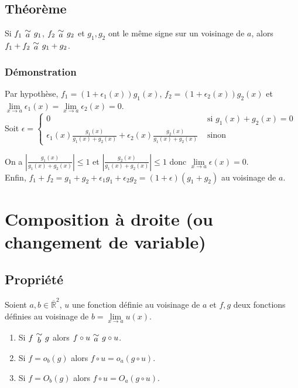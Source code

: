 \documentclass[a4paper,10pt]{book} %
\newcommand{\Rb}{\overline{\mathbb{R}}}
\newcommand{\equi}[1]{\renewcommand{\arraystretch}{0.3}~\begin{matrix}\sim\\#1\end{matrix}~\renewcommand{\arraystretch}{1}}
\begin{document}
\subsection{Théorème}
Si $f_1 \equi{a} g_1$, $f_2 \equi{a}g_2$ et $g_1,g_2$ ont le même signe sur un voisinage de $a$, alors $f_1+f_2 \equi{a} g_1+g_2$.

\subsubsection{Démonstration}
Par hypothèse, $f_1=(1+\epsilon_1(x))g_1(x)$, $f_2=(1+\epsilon_2(x))g_2(x)$ et $\lim\limits_{x\rightarrow a}\epsilon_1(x)=\lim\limits_{x\rightarrow a}\epsilon_2(x)=0$.\\

Soit $\epsilon=\left\{\begin{array}{clr}
0 &\text{ si }g_1(x)+g_2(x)=0 \\ 
\epsilon_1(x)\frac{g_1(x)}{g_1(x)+g_2(x)}+\epsilon_2(x)\frac{g_2(x)}{g_1(x)+g_2(x)} &\text{ sinon}
\end{array}\right.$\\

\smallskip

On a $|\frac{g_1(x)}{g_1(x)+g_2(x)}|\leq 1$ et $|\frac{g_2(x)}{g_1(x)+g_2(x)}|\leq 1$ donc $\lim\limits_{x\rightarrow a}\epsilon(x)=0$.\\

Enfin, $f_1+f_2=g_1+g_2+\epsilon_1g_1+\epsilon_2g_2=(1+\epsilon)(g_1+g_2)$ au voisinage de $a$.\\

\newpage

\section{Composition à droite (ou changement de variable)}
\subsection{Propriété}
Soient $a,b\in \Rb^2$, $u$ une fonction définie au voisinage de $a$ et $f,g$ deux fonctions définies au voisinage de $b=\lim\limits_{x\rightarrow a}u(x)$.

\begin{enumerate}
\item Si $f \equi{b} g$ alors $f \circ u \equi{a} g\circ u$.
\item Si $f=o_b(g)$ alors $f\circ u=o_a(g\circ u)$.
\item Si $f=O_b(g)$ alors $f\circ u = O_a(g\circ u)$.
\end{enumerate}
\end{document}
